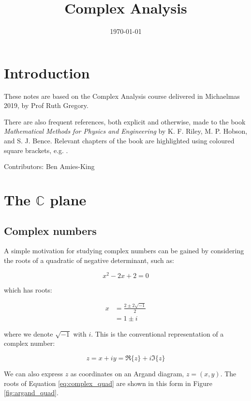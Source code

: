 \documentclass{../../physics_notes}
\title{Complex Analysis}
\date{\today}
\begin{document}
\maketitle
\tableofcontents
\newpage

\section*{Introduction}

These notes are based on the Complex Analysis course delivered in Michaelmas 2019, by Prof Ruth Gregory. 

There are also frequent references, both explicit and otherwise, made to the book \emph{Mathematical Methods for Physics and Engineering} by K. F. Riley, M. P. Hobson, and S. J. Bence. Relevant chapters of the book are highlighted using coloured square brackets, e.g. .

Contributors: Ben Amies-King

\section{The $\mathbb{C}$ plane}
\subsection{Complex numbers}

A simple motivation for studying complex numbers can be gained by considering the roots of a quadratic of negative determinant, such as:

\begin{equation}\label{eq:complex_quad}
x^2 -2x + 2 = 0
\end{equation}

which has roots:

\begin{align}
x &= \frac{2 \pm 2\sqrt{-1}}{2} \nonumber \\
&= 1 \pm i \nonumber
\end{align}

where we denote $\sqrt{-1}$ with $i$. This is the conventional representation of a complex number:

\begin{equation}
z = x + iy = \Re\{z\} + i\Im\{z\}
\end{equation}

We can also express $z$ as coordinates on an Argand diagram, $z = (x,y)$. The roots of Equation \ref{eq:complex_quad} are shown in this form in Figure \ref{fig:argand_quad}.
\end{document}

